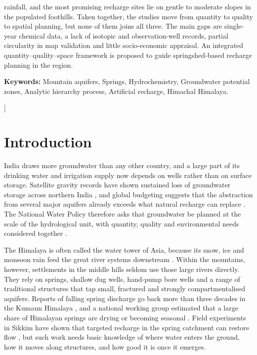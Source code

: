 \documentclass[10pt,a4paper,twocolumn]{article}
\begin{document}
{{\begin{minipage}{\dimexpr\textwidth-2\fboxsep\relax}
rainfall, and the most promising recharge sites lie on gentle to moderate slopes in the
populated foothills. Taken together, the studies move from quantity to quality to spatial
planning, but none of them joins all three. The main gaps are single-year chemical data, a
lack of isotopic and observation-well records, partial circularity in map validation and
little socio-economic appraisal. An integrated quantity--quality--space framework is
proposed to guide springshed-based recharge planning in the region.
\par\vspace{5pt}
\noindent\textbf{Keywords:} Mountain aquifers, Springs, Hydrochemistry, Groundwater potential
zones, Analytic hierarchy process, Artificial recharge, Himachal Himalaya.
\vspace{4pt}
\end{minipage}}
\vspace{14pt}
}]

\section{Introduction}

India draws more groundwater than any other country, and a large part of its drinking
water and irrigation supply now depends on wells rather than on surface storage. Satellite
gravity records have shown sustained loss of groundwater storage across northern India
\citep{rodell2009}, and global budgeting suggests that the abstraction from several major
aquifers already exceeds what natural recharge can replace \citep{gleeson2012}. The
National Water Policy therefore asks that groundwater be planned at the scale of the
hydrological unit, with quantity, quality and environmental needs considered together
\citep{mowr2002}.

The Himalaya is often called the water tower of Asia, because its snow, ice and monsoon
rain feed the great river systems downstream \citep{immerzeel2010}. Within the mountains,
however, settlements in the middle hills seldom use those large rivers directly. They rely
on springs, shallow dug wells, hand-pump bore wells and a range of traditional structures
that tap small, fractured and strongly compartmentalised aquifers. Reports of falling spring
discharge go back more than three decades in the Kumaun Himalaya \citep{valdiya1989}, and a
national working group estimated that a large share of Himalayan springs are drying or
becoming seasonal \citep{niti2018}. Field experiments in Sikkim have shown that targeted
recharge in the spring catchment can restore flow \citep{tambe2012}, but such work needs
basic knowledge of where water enters the ground, how it moves along structures, and how
good it is once it emerges.
\end{document}
